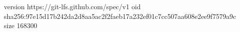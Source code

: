version https://git-lfs.github.com/spec/v1
oid sha256:97e15d17b242da2d8aa5ac2f2faeb17a232ef01c7cc507aa608e2ee9f7579a9c
size 168300
